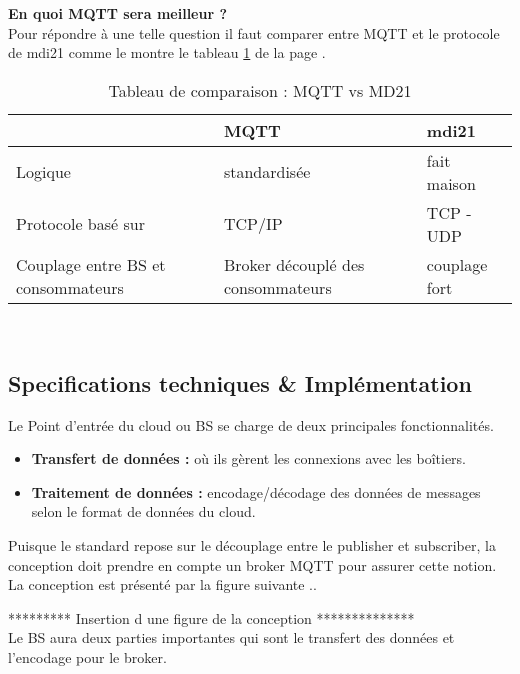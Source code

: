     \textbf{En quoi MQTT sera meilleur ?  } \\
    Pour répondre à une telle question il faut comparer entre MQTT et le protocole de \gls{mdi21} comme le montre le tableau \ref{table:mqttvsmd21}
    de la page \pageref{table:mqttvsmd21}.
    \begin{table}[h!]
        \centering
        \begin{tabular}{|p{5cm}|p{5cm}|p{5cm}|}
            \hline
            \centering

               & MQTT & \gls{mdi21} \\
            \hline
            Logique & standardisée & fait maison  \\
            \hline
           Protocole basé sur & TCP/IP & TCP - UDP\\
            \hline 
            Couplage entre BS et consommateurs & Broker découplé des consommateurs & couplage fort \\
            \hline
        \end{tabular}   
        \caption{Tableau de comparaison : MQTT vs MD21}
        \label{table:mqttvsmd21}
    \end{table} \\
       
    \break

    \subsection{Specifications techniques \& Implémentation}
       
        Le Point d’entrée du cloud ou BS se charge de deux principales fonctionnalités. 
        \begin{itemize}
            \renewcommand{\labelitemi}{$\bullet$}
            \item  \textbf{Transfert de données :} où ils gèrent les connexions avec les boîtiers.
            \item  \textbf{Traitement de données :} encodage/décodage des données de messages selon le format de données du cloud.
        \end{itemize}

        Puisque le standard repose sur le découplage entre le publisher et subscriber, la conception doit prendre 
        en compte  un broker MQTT pour assurer cette notion. 
        La conception est présenté par la figure suivante .. 

 ********* Insertion d une figure de la conception ************** \\
        Le BS aura deux parties importantes qui sont le transfert des données et l'encodage pour le broker.

